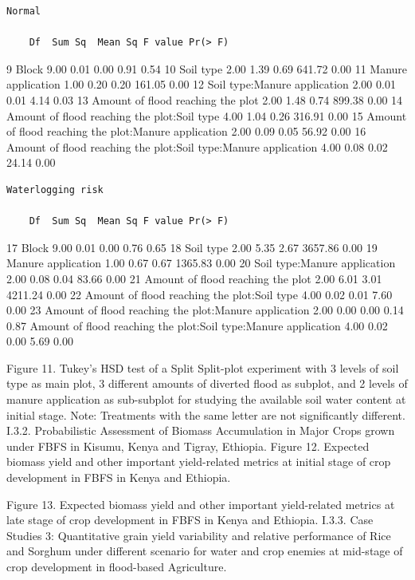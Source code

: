 \documentclass[12pt,oneside]{article}
\begin{document}
\begin{verbatim}
Normal

    Df  Sum Sq  Mean Sq F value Pr(> F)
\end{verbatim}

9 Block 9.00 0.01 0.00 0.91 0.54
10 Soil type 2.00 1.39 0.69 641.72 0.00
11 Manure application 1.00 0.20 0.20 161.05 0.00
12 Soil type:Manure application 2.00 0.01 0.01 4.14 0.03
13 Amount of flood reaching the plot 2.00 1.48 0.74 899.38 0.00
14 Amount of flood reaching the plot:Soil type 4.00 1.04 0.26 316.91 0.00
15 Amount of flood reaching the plot:Manure application 2.00 0.09 0.05 56.92 0.00
16 Amount of flood reaching the plot:Soil type:Manure application 4.00 0.08 0.02 24.14 0.00

\begin{verbatim}
Waterlogging risk

    Df  Sum Sq  Mean Sq F value Pr(> F)
\end{verbatim}

17 Block 9.00 0.01 0.00 0.76 0.65
18 Soil type 2.00 5.35 2.67 3657.86 0.00
19 Manure application 1.00 0.67 0.67 1365.83 0.00
20 Soil type:Manure application 2.00 0.08 0.04 83.66 0.00
21 Amount of flood reaching the plot 2.00 6.01 3.01 4211.24 0.00
22 Amount of flood reaching the plot:Soil type 4.00 0.02 0.01 7.60 0.00
23 Amount of flood reaching the plot:Manure application 2.00 0.00 0.00 0.14 0.87
Amount of flood reaching the plot:Soil type:Manure application 4.00 0.02 0.00 5.69 0.00

Figure 11. Tukey's HSD test of a Split Split-plot experiment with 3 levels of soil type as main plot, 3 different amounts of diverted flood as subplot, and 2 levels of manure application as sub-subplot for studying the available soil water content at initial stage.
Note: Treatments with the same letter are not significantly different.
I.3.2. Probabilistic Assessment of Biomass Accumulation in Major Crops grown under FBFS in Kisumu, Kenya and Tigray, Ethiopia.
Figure 12. Expected biomass yield and other important yield-related metrics at initial stage of crop development in FBFS in Kenya and Ethiopia.

Figure 13. Expected biomass yield and other important yield-related metrics at late stage of crop development in FBFS in Kenya and Ethiopia.
I.3.3. Case Studies 3: Quantitative grain yield variability and relative performance of Rice and Sorghum under different scenario for water and crop enemies at mid-stage of crop development in flood-based Agriculture.
\end{document}
